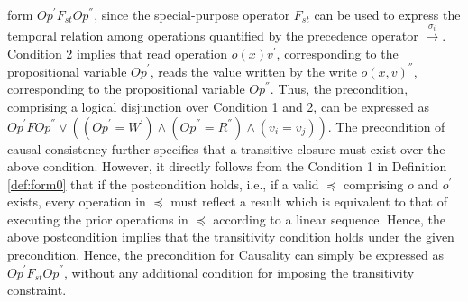 \documentclass[acmlarge, ,11pt]{acmart}
\begin{document}
 form ${\mathit{Op}}^{'} F_\mathit{st} {\mathit{Op}}^{''}$, since the special-purpose operator $F_\mathit{st}$ can be used to express the temporal relation among operations  quantified by the precedence operator $\xrightarrow{\sigma_i}$.
 Condition 2 implies that read operation $\mathit{o}(x){v}^{'}$, corresponding to the propositional variable ${\mathit{Op}}^{'} $, reads the value
 written by the write $\mathit{o}(x,v)^{''}$, corresponding to the propositional variable  ${\mathit{Op}}^{''}$. Thus, the precondition, comprising a logical disjunction over Condition 1 and 2, can be expressed as %
  $ {\mathit{Op}}^{'} F {\mathit{Op}}^{''} \vee
 \left( \left( {\mathit{Op}}^{'} = {W}^{'} \right) \wedge \left( {\mathit{Op}}^{''} = {R}^{''} \right) \wedge
   \left( v_i = v_j \right) \right)$. The precondition of causal consistency further specifies that a transitive closure
must exist over the above condition. %
  However, it directly follows from the Condition 1 in Definition \ref{def:form0} that if the postcondition holds, i.e., if a valid $\preccurlyeq$ comprising $\mathit{o}$  and $\mathit{o}^{'} $ exists,  every operation in $ \preccurlyeq$ must reflect a result which is equivalent to that of executing the prior operations in $ \preccurlyeq$ according to a linear sequence. Hence, the above postcondition implies that the transitivity condition holds under the given precondition. Hence, the precondition for Causality can simply be expressed as ${\mathit{Op}}^{'}  F_\mathit{st}  {\mathit{Op}}^{''}$, without any additional condition for imposing the transitivity constraint. %
\end{document}
